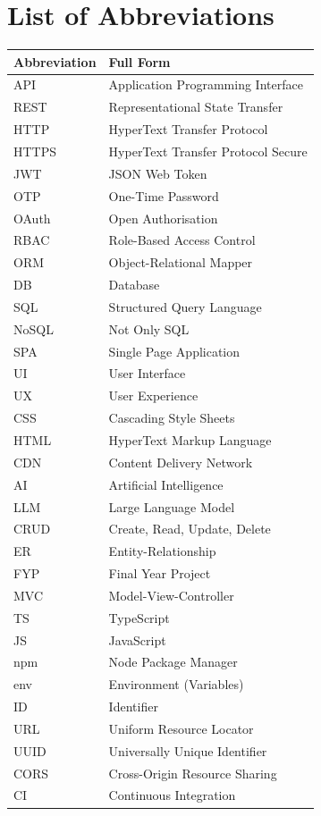 \chapter*{List of Abbreviations}

\begin{longtable}{@{}p{4cm} p{10cm}@{}}
\toprule
\textbf{Abbreviation} & \textbf{Full Form} \\
\midrule
\endhead
\bottomrule
\endfoot

API  & Application Programming Interface \\
REST & Representational State Transfer \\
HTTP & HyperText Transfer Protocol \\
HTTPS & HyperText Transfer Protocol Secure \\
JWT  & JSON Web Token \\
OTP  & One-Time Password \\
OAuth & Open Authorisation \\
RBAC & Role-Based Access Control \\
ORM  & Object-Relational Mapper \\
DB   & Database \\
SQL  & Structured Query Language \\
NoSQL & Not Only SQL \\
SPA  & Single Page Application \\
UI   & User Interface \\
UX   & User Experience \\
CSS  & Cascading Style Sheets \\
HTML & HyperText Markup Language \\
CDN  & Content Delivery Network \\
AI   & Artificial Intelligence \\
LLM  & Large Language Model \\
CRUD & Create, Read, Update, Delete \\
ER   & Entity-Relationship \\
FYP  & Final Year Project \\
MVC  & Model-View-Controller \\
TS   & TypeScript \\
JS   & JavaScript \\
npm  & Node Package Manager \\
env  & Environment (Variables) \\
ID   & Identifier \\
URL  & Uniform Resource Locator \\
UUID & Universally Unique Identifier \\
CORS & Cross-Origin Resource Sharing \\
CI   & Continuous Integration \\
\end{longtable}

\clearpage
